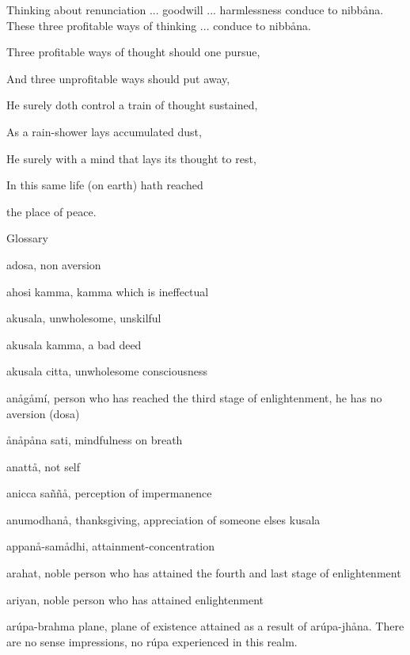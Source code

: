 \documentclass[12pt,twoside]{article}
\begin{document}
Thinking about renunciation ... goodwill ... harmlessness conduce to
nibb{\aa}na. These three profitable ways of thinking ... conduce to
nibb{\aa}na.{\textquotesingle}


\bigskip


\bigskip


\bigskip


\bigskip

Three profitable ways of thought should one pursue,

And three unprofitable ways should put away,

He surely doth control a train of thought sustained, 

As a rain{}-shower lays accumulated dust,

He surely with a mind that lays its thought to rest,

In this same life (on earth) hath reached 

 the place of peace.


\bigskip

\clearpage
Glossary


\bigskip


\bigskip


\bigskip

adosa, non aversion

ahosi kamma, kamma which is ineffectual

akusala, unwholesome, unskilful

akusala kamma, a bad deed

akusala citta, unwholesome consciousness

an{\aa}g{\aa}m\'i, person who has reached the third stage of
enlightenment, he has no aversion (dosa)

{\aa}n{\aa}p{\aa}na sati, mindfulness on breath

anatt{\aa}, not self

anicca sa\~n\~n{\aa}, perception of impermanence

anumodhan{\aa}, thanksgiving, appreciation of someone
else{\textquotesingle}s kusala

appan{\aa}{}-sam{\aa}dhi, attainment{}-concentration

arahat, noble person who has attained the fourth and last stage of
enlightenment

ariyan, noble person who has attained enlightenment

ar\'upa{}-brahma plane, plane of existence attained as a result of
ar\'upa{}-jh{\aa}na. There are no sense impressions, no r\'upa
experienced in this realm.
\end{document}
